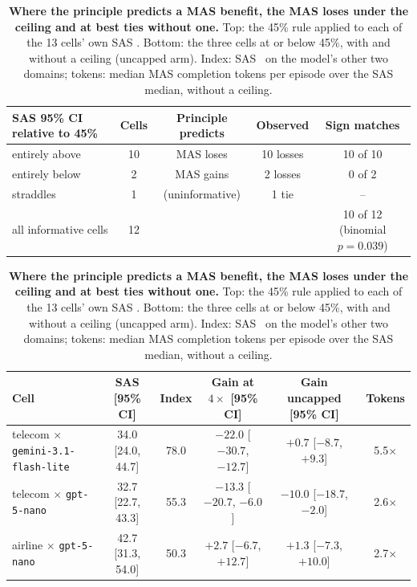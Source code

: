 \begin{table}[t]
\caption{\textbf{Where the principle predicts a MAS benefit, the MAS loses under the ceiling and at best ties without one.} Top: the 45\% rule applied to each of the 13 cells' own SAS \passone. Bottom: the three cells at or below 45\%, with and without a ceiling (uncapped arm). Index: SAS \passone\ on the model's other two domains; tokens: median MAS completion tokens per episode over the SAS median, without a ceiling.}
\label{tab:rule}
\begin{center}
\scriptsize
\setlength{\tabcolsep}{4pt}
\begin{tabular}{@{}lcccc@{}}
\toprule
SAS 95\% CI relative to 45\% & Cells & Principle predicts & Observed & Sign matches \\
\midrule
entirely above & 10 & MAS loses & 10 losses & 10 of 10 \\
entirely below & 2 & MAS gains & 2 losses & 0 of 2 \\
straddles & 1 & (uninformative) & 1 tie & -- \\
\midrule
all informative cells & 12 & & & 10 of 12 (binomial $p = 0.039$) \\
\bottomrule
\end{tabular}

\vspace{6pt}
\begin{tabular}{@{}lccccc@{}}
\toprule
Cell & SAS [95\% CI] & Index & Gain at $4\times$ [95\% CI] & Gain uncapped [95\% CI] & Tokens \\
\midrule
telecom $\times$ \texttt{gemini-3.1-flash-lite} & 34.0 [24.0, 44.7] & 78.0 & $-22.0$ [$-30.7$, $-12.7$] & $+0.7$ [$-8.7$, $+9.3$] & 5.5$\times$ \\
telecom $\times$ \texttt{gpt-5-nano} & 32.7 [22.7, 43.3] & 55.3 & $-13.3$ [$-20.7$, $-6.0$] & $-10.0$ [$-18.7$, $-2.0$] & 2.6$\times$ \\
airline $\times$ \texttt{gpt-5-nano} & 42.7 [31.3, 54.0] & 50.3 & $+2.7$ [$-6.7$, $+12.7$] & $+1.3$ [$-7.3$, $+10.0$] & 2.7$\times$ \\
\bottomrule
\end{tabular}
\end{center}
\end{table}

